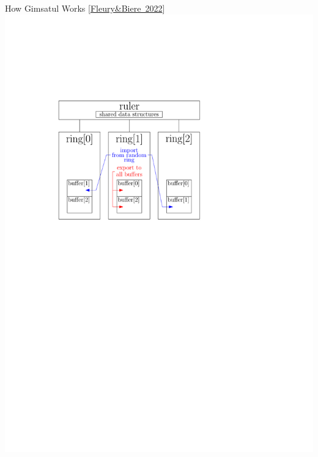 \documentclass[]{sdqbeamer}
\begin{document}
\begin{frame}{How Gimsatul Works [\href{https://arxiv.org/pdf/2207.13577}{Fleury\&Biere~2022}]}
    \center
    \includegraphics[scale=1.5]{figures/gimsatul_architecture.pdf}
\end{frame}

\end{document}
